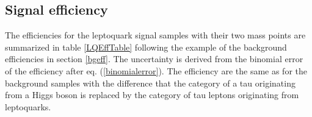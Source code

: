 %
\subsection{Signal efficiency}\label{signaleff}
The efficiencies for the leptoquark signal samples with their two mass points are summarized in table \ref{LQEffTable} following the example of the background efficiencies in section \ref{bgeff}. The uncertainty is derived from the binomial error of the efficiency after eq. (\ref{binomialerror}). The efficiency are the same as for the background samples with the difference that the category of a tau originating from a Higgs boson is replaced by the category of tau leptons originating from leptoquarks.\par
%	
